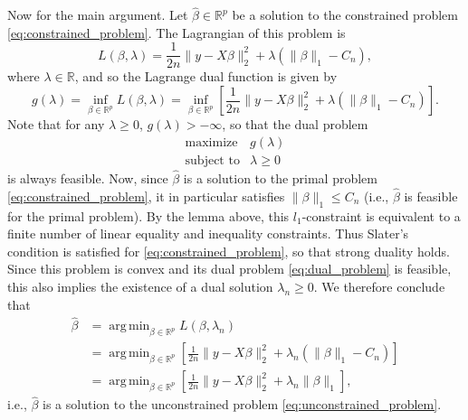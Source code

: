 \documentclass[letterpaper,12pt]{article}
\DeclareMathOperator*{\argmin}{arg\,min}
\newcommand{\norm}[1]{\lVert#1\rVert}
\begin{document}
Now for the main argument. Let $\hat{\beta} \in \mathbb{R}^p$ be a
solution to the constrained problem
\eqref{eq:constrained_problem}. The Lagrangian of this problem is
\begin{equation*}
  L(\beta, \lambda) = \frac{1}{2n} \norm{y - X\beta}_2^2
    + \lambda(\norm{\beta}_1 - C_n),
\end{equation*}
where $\lambda \in \mathbb{R}$, and so the Lagrange dual function is
given by
\begin{equation*}
  g(\lambda) = \inf_{\beta \in \mathbb{R}^p} L(\beta, \lambda)
    = \inf_{\beta \in \mathbb{R}^p} \left [ \frac{1}{2n} \norm{y - X\beta}_2^2
      + \lambda(\norm{\beta}_1 - C_n) \right ].
\end{equation*}
Note that for any $\lambda \geq 0$, $g(\lambda) > -\infty$, so that
the dual problem
\begin{equation} \label{eq:dual_problem}
  \begin{array}{ll}
    \text{maximize} & g(\lambda) \\
    \text{subject to}
      & \lambda \geq 0
  \end{array}
\end{equation}
is always feasible. Now, since $\hat{\beta}$ is a solution to the
primal problem \eqref{eq:constrained_problem}, it in particular
satisfies $\norm{\beta}_1 \leq C_n$ (i.e., $\hat{\beta}$ is feasible
for the primal problem). By the lemma above, this $l_1$-constraint is
equivalent to a finite number of linear equality and inequality
constraints. Thus Slater's condition is satisfied for
\eqref{eq:constrained_problem}, so that strong duality holds. Since
this problem is convex and its dual problem \eqref{eq:dual_problem} is
feasible, this also implies the existence of a dual solution
$\lambda_n \geq 0$. We therefore conclude that
\begin{align*}
  \hat{\beta} &= \argmin_{\beta \in \mathbb{R}^p} L(\beta, \lambda_n) \\
    &= \argmin_{\beta \in \mathbb{R}^p} \left [ \frac{1}{2n}
      \norm{y - X\beta}_2^2 + \lambda_n (\norm{\beta}_1 - C_n) \right ] \\
    &= \argmin_{\beta \in \mathbb{R}^p} \left [ \frac{1}{2n}
      \norm{y - X\beta}_2^2 + \lambda_n \norm{\beta}_1 \right ],
\end{align*}
i.e., $\hat{\beta}$ is a solution to the unconstrained problem
\eqref{eq:unconstrained_problem}.
\end{document}
